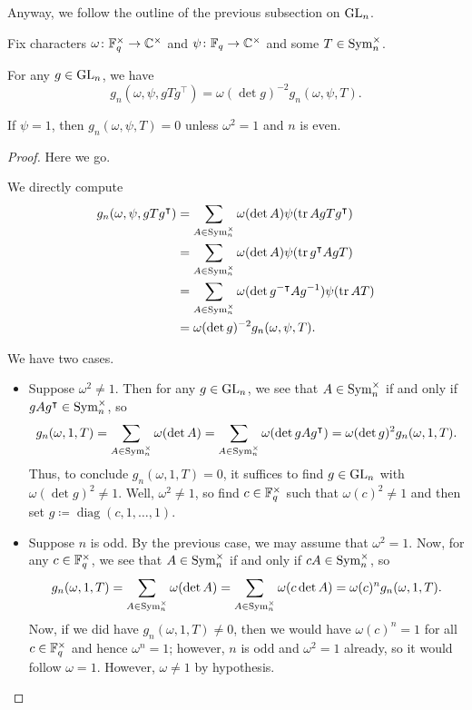 Anyway, we follow the outline of the previous subsection on $\mathrm{GL}_n$.
\begin{lemma} \label{lem:gsum-sym-basic}
    Fix characters $\omega\colon\mathbb F_q^\times\to\mathbb C^\times$ and $\psi\colon\mathbb F_q\to\mathbb C^\times$ and some $T\in\operatorname{Sym}_n^\times$.
    \begin{listalph}
        \item For any $g\in\mathrm{GL}_n$, we have
        \[g_n(\omega,\psi,gTg^\intercal)=\omega(\det g)^{-2}g_n(\omega,\psi,T).\]
        \item If $\psi=1$, then $g_n(\omega,\psi,T)=0$ unless $\omega^2=1$ and $n$ is even.
    \end{listalph}
\end{lemma}
\begin{proof}
    Here we go.
    \begin{listalph}
        \item We directly compute
        \begin{align*}
            g_n(\omega,\psi,gTg^\intercal) &= \sum_{A\in\operatorname{Sym}_n^\times}\omega(\det A)\psi(\operatorname{tr} AgTg^\intercal) \\
            &= \sum_{A\in\operatorname{Sym}_n^\times}\omega(\det A)\psi(\operatorname{tr} g^\intercal AgT) \\
            &= \sum_{A\in\operatorname{Sym}_n^\times}\omega(\det g^{-\intercal}Ag^{-1})\psi(\operatorname{tr} AT) \\
            &= \omega(\det g)^{-2}g_n(\omega,\psi,T).
        \end{align*}
        \item We have two cases.
        \begin{itemize}
            \item Suppose $\omega^2\ne1$. Then for any $g\in\mathrm{GL}_n$, we see that $A\in\operatorname{Sym}_n^\times$ if and only if $gAg^\intercal\in\operatorname{Sym}_n^\times$, so
            \[g_n(\omega,1,T)=\sum_{A\in\operatorname{Sym}_n^\times}\omega(\det A)=\sum_{A\in\operatorname{Sym}_n^\times}\omega(\det gAg^\intercal)=\omega(\det g)^2g_n(\omega,1,T).\]
            Thus, to conclude $g_n(\omega,1,T)=0$, it suffices to find $g\in\mathrm{GL}_n$ with $\omega(\det g)^2\ne1$. Well, $\omega^2\ne1$, so find $c\in\mathbb F_q^\times$ such that $\omega(c)^2\ne1$ and then set $g\coloneqq\operatorname{diag}(c,1,\ldots,1)$.
            \item Suppose $n$ is odd. By the previous case, we may assume that $\omega^2=1$. Now, for any $c\in\mathbb F_q^\times$, we see that $A\in\operatorname{Sym}_n^\times$ if and only if $cA\in\operatorname{Sym}_n^\times$, so
            \[g_n(\omega,1,T)=\sum_{A\in\operatorname{Sym}_n^\times}\omega(\det A)=\sum_{A\in\operatorname{Sym}_n^\times}\omega(c\det A)=\omega(c)^ng_n(\omega,1,T).\]
            Now, if we did have $g_n(\omega,1,T)\ne0$, then we would have $\omega(c)^n=1$ for all $c\in\mathbb F_q^\times$ and hence $\omega^n=1$; however, $n$ is odd and $\omega^2=1$ already, so it would follow $\omega=1$. However, $\omega\ne1$ by hypothesis.
            \qedhere
        \end{itemize}
    \end{listalph}
\end{proof}
